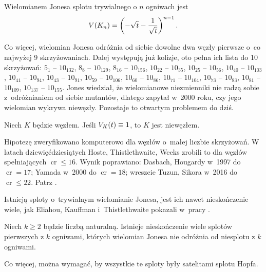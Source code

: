 \begin{proposition}
    \label{prp:jones_trivial_link}
    Wielomianem Jonesa splotu trywialnego o $n$ ogniwach jest
    \begin{equation}
        V(K_n) = \left(-\sqrt{t} - \frac{1}{\sqrt {t}}\right)^{n-1}.
    \end{equation}
\end{proposition}

Co więcej, wielomian Jonesa odróżnia od siebie dowolne dwa węzły pierwsze o~co najwyżej 9 skrzyżowaniach.
Dalej występują już kolizje, oto pełna ich lista do 10 skrzyżowań:
$5_{1}$ -- $10_{132}$,
$8_{8}$ -- $10_{129}$,
$8_{16}$ -- $10_{156}$,
$10_{22}$ -- $10_{35}$,
$10_{25}$ -- $10_{56}$,
$10_{40}$ -- $10_{103}$,
$10_{41}$ -- $10_{94}$,
$10_{43}$ -- $10_{91}$,
$10_{59}$ -- $10_{106}$,
$10_{60}$ -- $10_{86}$,
$10_{71}$ -- $10_{104}$,
$10_{73}$ -- $10_{83}$,
$10_{81}$ -- $10_{109}$,
$10_{137}$ -- $10_{155}$.
Jones wiedział, że wielomianowe niezmienniki nie radzą sobie z~odróżnianiem od siebie mutantów, dlatego zapytał w~2000 roku, czy jego wielomian wykrywa niewęzły.
Pozostaje to otwartym problemem do dziś.

\begin{conjecture}
%
\label{con:jones}%
    Niech $K$ będzie węzłem.
    Jeśli $V_K(t) \equiv 1$, to $K$ jest niewęzłem.
\end{conjecture}

Hipotezę zweryfikowano komputerowo dla węzłów o~małej liczbie skrzyżowań.
W latach dziewięćdziesiątych Hoste, Thistlethwaite, Weeks zrobili to dla węzłów spełniających $\operatorname{cr} \le 16$.
Wynik poprawiano: Dasbach, Hougardy w~1997 do $\operatorname{cr} = 17$; Yamada w~2000 do $\operatorname{cr} = 18$; wreszcie Tuzun, Sikora w~2016 do $\operatorname{cr} \le 22$.
Patrz \cite[s. 381]{ohtsuki02}.


Istnieją sploty o~trywialnym wielomianie Jonesa, jest ich nawet nieskończenie wiele, jak Eliahou, Kauffman i~Thistlethwaite pokazali w~pracy \cite{eliahou03}.

\begin{proposition}
    Niech $k \ge 2$ będzie liczbą naturalną.
    Istnieje nieskończenie wiele splotów pierwszych z $k$ ogniwami, których wielomian Jonesa nie odróżnia od niesplotu z $k$ ogniwami.

    Co więcej, można wymagać, by wszystkie te sploty były satelitami splotu Hopfa.
%
\end{proposition}

